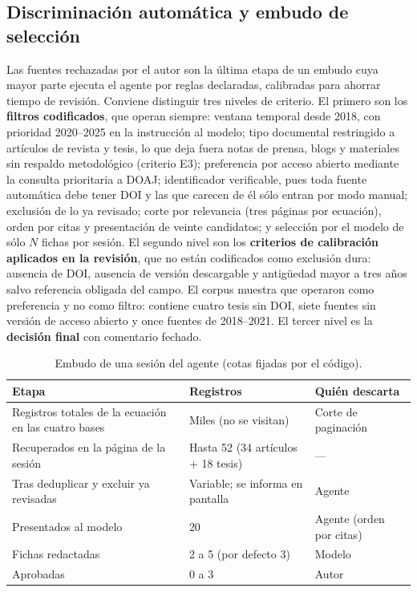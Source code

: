 \documentclass[letter,12pt]{article}
\begin{document}
\subsection{Discriminación automática y embudo de selección}

Las fuentes rechazadas por el autor son la última etapa de un embudo cuya mayor parte ejecuta el agente por reglas declaradas, calibradas para ahorrar tiempo de revisión. Conviene distinguir tres niveles de criterio. El primero son los \textbf{filtros codificados}, que operan siempre: ventana temporal desde 2018, con prioridad 2020--2025 en la instrucción al modelo; tipo documental restringido a artículos de revista y tesis, lo que deja fuera notas de prensa, blogs y materiales sin respaldo metodológico (criterio E3); preferencia por acceso abierto mediante la consulta prioritaria a DOAJ; identificador verificable, pues toda fuente automática debe tener DOI y las que carecen de él sólo entran por modo manual; exclusión de lo ya revisado; corte por relevancia (tres páginas por ecuación), orden por citas y presentación de veinte candidatos; y selección por el modelo de sólo $N$ fichas por sesión. El segundo nivel son los \textbf{criterios de calibración aplicados en la revisión}, que no están codificados como exclusión dura: ausencia de DOI, ausencia de versión descargable y antigüedad mayor a tres años salvo referencia obligada del campo. El corpus muestra que operaron como preferencia y no como filtro: contiene cuatro tesis sin DOI, siete fuentes sin versión de acceso abierto y once fuentes de 2018--2021. El tercer nivel es la \textbf{decisión final} con comentario fechado.

\begin{table}[H]
\centering
\footnotesize
\caption{Embudo de una sesión del agente (cotas fijadas por el código).}
\label{tab:embudo}
\renewcommand{\arraystretch}{1.35}
\begin{tabular}{|p{6.6cm}|p{3.2cm}|p{2.8cm}|}
\hline
\rowcolor{bgCotejo}
\textbf{Etapa} & \textbf{Registros} & \textbf{Quién descarta} \\
\hline
Registros totales de la ecuación en las cuatro bases & Miles (no se visitan) & Corte de paginación \\
\hline
Recuperados en la página de la sesión & Hasta 52 (34 artículos + 18 tesis) & --- \\
\hline
Tras deduplicar y excluir ya revisadas & Variable; se informa en pantalla & Agente \\
\hline
Presentados al modelo & 20 & Agente (orden por citas) \\
\hline
Fichas redactadas & 2 a 5 (por defecto 3) & Modelo \\
\hline
Aprobadas & 0 a 3 & Autor \\
\hline
\end{tabular}
\end{table}
\end{document}
